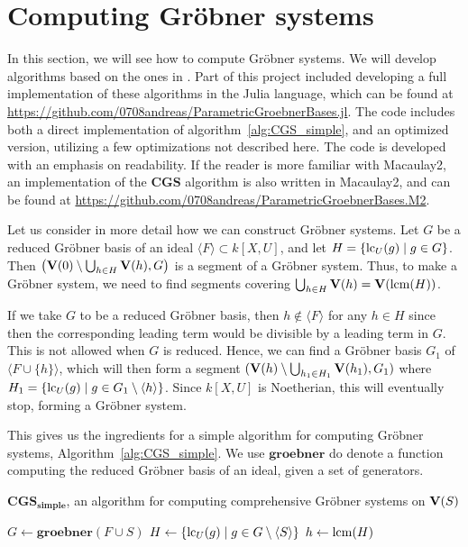 \section{Computing Gröbner systems}
In this section, we will see how to compute Gröbner systems. We will develop algorithms based on the ones in \cite{ss_algo}. Part of this project included developing a full implementation of these algorithms in the Julia language, which can be found at \url{https://github.com/0708andreas/ParametricGroebnerBases.jl}. The code includes both a direct implementation of algorithm~\ref{alg:CGS_simple}, and an optimized version, utilizing a few optimizations not described here. The code is developed with an emphasis on readability. If the reader is more familiar with Macaulay2, an implementation of the $\mathbf{CGS}$ algorithm is also written in Macaulay2, and can be found at \url{https://github.com/0708andreas/ParametricGroebnerBases.M2}.

Let us consider in more detail how we can construct Gröbner systems. Let $G$ be a reduced Gröbner basis of an ideal $\langle F \rangle \subset k[X, U]$, and let $H = \{\operatorname{lc}_{U}(g) \mid g \in G\}$. Then $\left(\operatorname{\mathbf V}(0) \setminus \bigcup_{h \in H} \operatorname{\mathbf V}(h), G\right)$ is a segment of a Gröbner system. Thus, to make a Gröbner system, we need to find segments covering $\bigcup_{h \in H} \operatorname{\mathbf V}(h) = \operatorname{\mathbf V}(\operatorname{lcm}(H))$.

If we take $G$ to be a reduced Gröbner basis, then $h \notin \langle F \rangle$ for any $h \in H$ since then the corresponding leading term would be divisible by a leading term in $G$. This is not allowed when $G$ is reduced. Hence, we can find a Gröbner basis $G_{1}$ of $\langle F \cup \{h\} \rangle$, which will then form a segment $(\operatorname{\mathbf V}(h) \setminus \bigcup_{h_{1} \in H_{1}} \operatorname{\mathbf V}(h_{1}), G_{1})$ where $H_{1} = \{\operatorname{lc}_{U}(g) \mid g \in G_{1} \setminus \langle h \rangle\}$. Since $k[X, U]$ is Noetherian, this will eventually stop, forming a Gröbner system.

This gives us the ingredients for a simple algorithm for computing Gröbner systems, Algorithm~\ref{alg:CGS_simple}. We use $\mathbf{groebner}$ do denote a function computing the reduced Gröbner basis of an ideal, given a set of generators.

\begin{algorithm}
  \caption{$\mathbf{CGS_{simple}}$, an algorithm for computing comprehensive Gröbner systems on $\operatorname{\mathbf V}(S)$}%
  \label{alg:CGS_simple}
    {
    \KwRet{\emptyset}\;
  } {
    $G \gets \mathbf{groebner}(F \cup S)$\;
    $H \gets \{\operatorname{lc}_{U}(g) \mid g \in G \setminus \langle S \rangle\}$\;
    $h \gets \operatorname{lcm}(H)$\;
  }
\end{algorithm}

